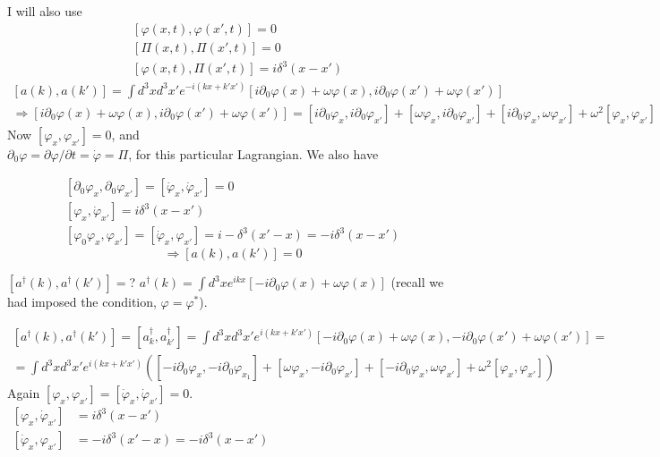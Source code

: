 \documentclass[twoside]{amsart}
\begin{document}
I will also use
\[
\begin{aligned}
  & \left[ \varphi(x,t), \varphi(x',t) \right] =0 \\ 
  & [ \Pi(x,t), \Pi(x',t) ] = 0 \\ 
  & [\varphi(x,t), \Pi(x',t) ] = i \delta^3(x-x')
\end{aligned}
\]
\[
\begin{gathered}
\left[ a(k), a(k') \right] = \int d^3x d^3x' e^{-i(kx + k'x') } [ i \partial_0 \varphi(x) + \omega \varphi(x), i \partial_0 \varphi(x') + \omega \varphi(x') ] \\ 
\Longrightarrow [i\partial_0 \varphi(x) + \omega \varphi(x), i \partial_0 \varphi(x') + \omega \varphi(x') ] = [i\partial_0 \varphi_x, i \partial_0 \varphi_{x'} ] + [ \omega \varphi_x, i \partial_0 \varphi_{x'}] + [i\partial_0 \varphi_x, \omega \varphi_{x'} ] + \omega^2 [\varphi_x, \varphi_{x'} ]
\end{gathered}
\]
Now $\left[ \varphi_x, \varphi_{x'} \right] =0$, and \\
 $\partial_0 \varphi  = \partial \varphi/\partial t = \dot{\varphi} = \Pi$, for this particular Lagrangian.  We also have

\[
\begin{gathered}
  \left[ \partial_0 \varphi_x, \partial_0 \varphi_{x'} \right] = [ \dot{\varphi}_x, \dot{\varphi}_{x'} ] =0 \\ 
  [\varphi_x, \dot{\varphi}_{x'} ] = i \delta^3(x-x') \\ 
  [ \varphi_0 \varphi_x, \varphi_{x'} ] = [ \dot{\varphi}_x, \varphi_{x'} ] = i - \delta^3(x'-x) = -i \delta^3(x-x')
\end{gathered}
\]
\[
\Longrightarrow \boxed{ [a(k),a(k')] =0  }
\]

$\left[ a^{\dag}(k), a^{\dag}(k') \right] = $?  $a^{\dag}(k) = \int d^3 x e^{ikx} [-i\partial_0 \varphi(x) + \omega \varphi(x)]$  (recall we had imposed the condition, $\varphi = \varphi^*$).  

\[
\begin{gathered}
  \left[ a^{\dag}(k), a^{\dag}(k') \right] = [a^{\dag}_k, a^{\dag}_{k'} ] = \int d^3x d^3 x' e^{i(kx + k'x')} [ -i \partial_0 \varphi(x) + \omega \varphi(x), -i \partial_0 \varphi(x') + \omega \varphi(x') ] = \\
  = \int d^3x d^3 x' e^{i (kx + k'x') } \left( [ -i \partial_0 \varphi_x, -i \partial_0 \varphi_{x_1} ] + [\omega \varphi_x, -i \partial_0 \varphi_{x'} ] + [ -i \partial_0 \varphi_x, \omega \varphi_{x'} ] + \omega^2 [\varphi_x, \varphi_{x'} ] \right)
\end{gathered}
\]
Again $\left[ \varphi_x, \varphi_{x'} \right] = [\dot{\varphi}_x, \dot{\varphi}_{x'} ] = 0$.  \\
$\begin{aligned} \left[ \varphi_x, \dot{\varphi}_{x'} \right] & = i \delta^3(x-x') \\ \left[ \dot{\varphi}_x , \varphi_{x'} \right] & = -i \delta^3(x'-x) = -i\delta^3(x-x') \end{aligned} $
\end{document}
